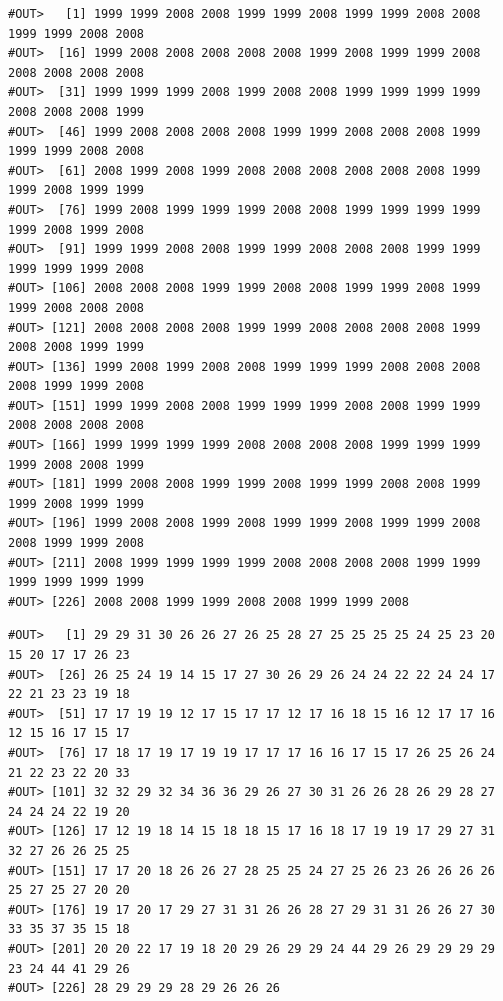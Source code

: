 \documentclass[]{book}
\newenvironment{Shaded}{\begin{snugshade}}{\end{snugshade}}
\newcommand{\OperatorTok}[1]{\textcolor[rgb]{0.81,0.36,0.00}{\textbf{#1}}}
\newcommand{\NormalTok}[1]{#1}
\begin{document}
\begin{Shaded}
\end{Shaded}

\begin{verbatim}
#OUT>   [1] 1999 1999 2008 2008 1999 1999 2008 1999 1999 2008 2008 1999 1999 2008 2008
#OUT>  [16] 1999 2008 2008 2008 2008 2008 1999 2008 1999 1999 2008 2008 2008 2008 2008
#OUT>  [31] 1999 1999 1999 2008 1999 2008 2008 1999 1999 1999 1999 2008 2008 2008 1999
#OUT>  [46] 1999 2008 2008 2008 2008 1999 1999 2008 2008 2008 1999 1999 1999 2008 2008
#OUT>  [61] 2008 1999 2008 1999 2008 2008 2008 2008 2008 2008 1999 1999 2008 1999 1999
#OUT>  [76] 1999 2008 1999 1999 1999 2008 2008 1999 1999 1999 1999 1999 2008 1999 2008
#OUT>  [91] 1999 1999 2008 2008 1999 1999 2008 2008 2008 1999 1999 1999 1999 1999 2008
#OUT> [106] 2008 2008 2008 1999 1999 2008 2008 1999 1999 2008 1999 1999 2008 2008 2008
#OUT> [121] 2008 2008 2008 2008 1999 1999 2008 2008 2008 2008 1999 2008 2008 1999 1999
#OUT> [136] 1999 2008 1999 2008 2008 1999 1999 1999 2008 2008 2008 2008 1999 1999 2008
#OUT> [151] 1999 1999 2008 2008 1999 1999 1999 2008 2008 1999 1999 2008 2008 2008 2008
#OUT> [166] 1999 1999 1999 1999 2008 2008 2008 2008 1999 1999 1999 1999 2008 2008 1999
#OUT> [181] 1999 2008 2008 1999 1999 2008 1999 1999 2008 2008 1999 1999 2008 1999 1999
#OUT> [196] 1999 2008 2008 1999 2008 1999 1999 2008 1999 1999 2008 2008 1999 1999 2008
#OUT> [211] 2008 1999 1999 1999 1999 2008 2008 2008 2008 1999 1999 1999 1999 1999 1999
#OUT> [226] 2008 2008 1999 1999 2008 2008 1999 1999 2008
\end{verbatim}

\begin{Shaded}
\end{Shaded}

\begin{verbatim}
#OUT>   [1] 29 29 31 30 26 26 27 26 25 28 27 25 25 25 25 24 25 23 20 15 20 17 17 26 23
#OUT>  [26] 26 25 24 19 14 15 17 27 30 26 29 26 24 24 22 22 24 24 17 22 21 23 23 19 18
#OUT>  [51] 17 17 19 19 12 17 15 17 17 12 17 16 18 15 16 12 17 17 16 12 15 16 17 15 17
#OUT>  [76] 17 18 17 19 17 19 19 17 17 17 16 16 17 15 17 26 25 26 24 21 22 23 22 20 33
#OUT> [101] 32 32 29 32 34 36 36 29 26 27 30 31 26 26 28 26 29 28 27 24 24 24 22 19 20
#OUT> [126] 17 12 19 18 14 15 18 18 15 17 16 18 17 19 19 17 29 27 31 32 27 26 26 25 25
#OUT> [151] 17 17 20 18 26 26 27 28 25 25 24 27 25 26 23 26 26 26 26 25 27 25 27 20 20
#OUT> [176] 19 17 20 17 29 27 31 31 26 26 28 27 29 31 31 26 26 27 30 33 35 37 35 15 18
#OUT> [201] 20 20 22 17 19 18 20 29 26 29 29 24 44 29 26 29 29 29 29 23 24 44 41 29 26
#OUT> [226] 28 29 29 29 28 29 26 26 26
\end{verbatim}
\end{document}
